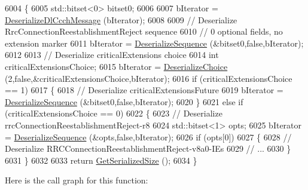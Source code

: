\begin{DoxyCode}
6004 \{
6005   std::bitset<0> bitset0;
6006 
6007   bIterator = \hyperlink{classns3_1_1RrcDlCcchMessage_a113d0d3c8e4cf337e3bc555c20079aff}{DeserializeDlCcchMessage} (bIterator);
6008 
6009   \textcolor{comment}{// Deserialize RrcConnectionReestablishmentReject sequence}
6010   \textcolor{comment}{// 0 optional fields, no extension marker}
6011   bIterator = \hyperlink{classns3_1_1Asn1Header_a58c68bb97ba3fe2e8fcdd7c208d672b2}{DeserializeSequence} (&bitset0,\textcolor{keyword}{false},bIterator);
6012 
6013   \textcolor{comment}{// Deserialize criticalExtensions choice}
6014   \textcolor{keywordtype}{int} criticalExtensionsChoice;
6015   bIterator = \hyperlink{classns3_1_1Asn1Header_a0af5881f07a0549a8693a1b75c229a90}{DeserializeChoice} (2,\textcolor{keyword}{false},&criticalExtensionsChoice,bIterator);
6016   \textcolor{keywordflow}{if} (criticalExtensionsChoice == 1)
6017     \{
6018       \textcolor{comment}{// Deserialize criticalExtensionsFuture}
6019       bIterator = \hyperlink{classns3_1_1Asn1Header_a58c68bb97ba3fe2e8fcdd7c208d672b2}{DeserializeSequence} (&bitset0,\textcolor{keyword}{false},bIterator);
6020     \}
6021   \textcolor{keywordflow}{else} \textcolor{keywordflow}{if} (criticalExtensionsChoice == 0)
6022     \{
6023       \textcolor{comment}{// Deserialize rrcConnectionReestablishmentReject-r8}
6024       std::bitset<1> opts;
6025       bIterator = \hyperlink{classns3_1_1Asn1Header_a58c68bb97ba3fe2e8fcdd7c208d672b2}{DeserializeSequence} (&opts,\textcolor{keyword}{false},bIterator);
6026       \textcolor{keywordflow}{if} (opts[0])
6027         \{
6028           \textcolor{comment}{// Deserialize RRCConnectionReestablishmentReject-v8a0-IEs}
6029           \textcolor{comment}{// ...}
6030         \}
6031     \}
6032 
6033   \textcolor{keywordflow}{return} \hyperlink{classns3_1_1Asn1Header_a18a67eb7869c5784f59d197bbd76a74f}{GetSerializedSize} ();
6034 \}
\end{DoxyCode}


Here is the call graph for this function\+:



